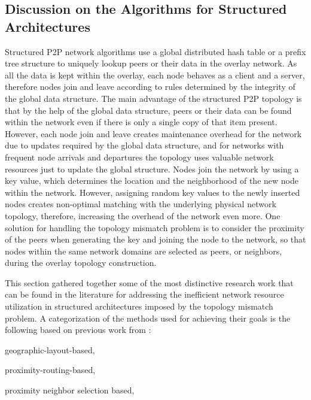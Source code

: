 \subsection{Discussion on the Algorithms for Structured Architectures}
Structured P2P network algorithms use a global distributed hash table or a
prefix tree structure to uniquely lookup peers or their data in the overlay
network. As all the data is kept within the overlay, each node behaves as a
client and a server, therefore nodes join and leave according to rules
determined by the integrity of the global data structure. The main advantage of
the structured P2P topology is that by the help of the global data structure,
peers or their data can be found within the network even if there is only a
single copy of that item present. However, each node join and leave creates
maintenance overhead for the network due to updates required by the global data
structure, and for networks with frequent node arrivals and departures the
topology uses valuable network resources just to update the global structure.
Nodes join the network by using a key value, which determines the location and
the neighborhood of the new node within the network. However, assigning
random key values to the newly inserted nodes creates non-optimal matching with
the underlying physical network topology, therefore, increasing the overhead of
the network even more. One solution for handling the topology mismatch problem
is to consider the proximity of the peers when generating the key and joining
the node to the network, so that nodes within the same network domains are
selected as peers, or neighbors, during the overlay topology construction.

This section gathered together some of the most distinctive research work that
can be found in the literature for addressing the inefficient network resource
utilization in structured architectures imposed by the topology mismatch
problem. A categorization of the methods used for achieving their goals is the
following based on previous work from
\cite{CDHR2002,CDCR2002,RSS2002}:
\begin{inparaenum}
  \item geographic-layout-based,
  \item proximity-routing-based,
  \item proximity neighbor selection based,
\end{inparaenum}

